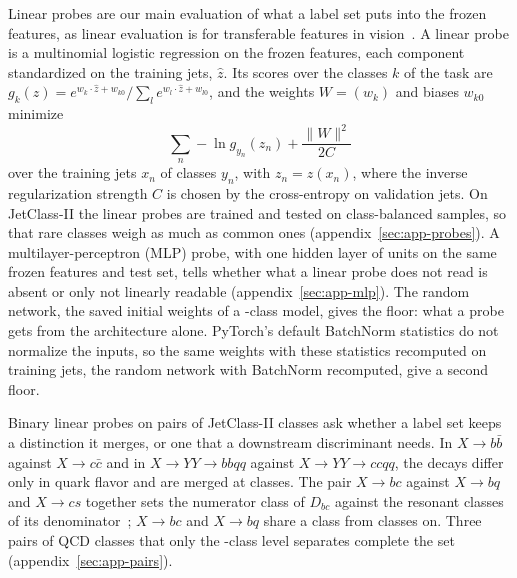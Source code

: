 Linear probes are our main evaluation of what a label set puts into the frozen features, as linear evaluation
is for transferable features in vision~\cite{kornblith}. A linear probe is a multinomial logistic regression on
the frozen features, each component standardized on the training jets, $\hat z$. Its scores over the classes $k$
of the task are $g_k(z) = e^{w_k\cdot\hat z + w_{k0}} / \sum_l e^{w_l\cdot\hat z + w_{l0}}$, and the weights
$W = (w_k)$ and biases $w_{k0}$ minimize
\begin{equation}\label{eq:probe}
  \sum_{n} -\ln g_{y_n}(z_n) + \frac{\lVert W\rVert^2}{2C}
\end{equation}
over the training jets $x_n$ of classes $y_n$, with $z_n = z(x_n)$, where the inverse regularization strength $C$
is chosen by the cross-entropy on validation jets. On JetClass-II the linear probes are trained and tested on
class-balanced samples, so that rare classes weigh as much as common ones (appendix~\ref{sec:app-probes}). A
multilayer-perceptron (MLP) probe, with one hidden layer of \LpMlpHidden{} units on the same frozen features and test
set, tells whether what a linear probe does not read is absent or only not linearly readable
(appendix~\ref{sec:app-mlp}). The random network, the saved initial weights of a \Kfull-class model, gives the
floor: what a probe gets from the architecture alone. PyTorch's default BatchNorm statistics do not normalize the
inputs, so the same weights with these statistics recomputed on \DesignBnJets{} training jets, the random network
with BatchNorm recomputed, give a second floor.

Binary linear probes on pairs of JetClass-II classes ask whether a label set keeps a distinction it merges, or
one that a downstream discriminant needs. In $X\to b\bar b$ against $X\to c\bar c$ and in $X\to YY\to bbqq$
against $X\to YY\to ccqq$, the decays differ only in quark flavor and are merged at \Kcoarse{} classes. The
pair $X\to bc$ against $X\to bq$ and $X\to cs$ together sets the numerator class of $D_{bc}$ against the
resonant classes of its denominator~\cite[Eq.~(1)]{vcbboosted}; $X\to bc$ and $X\to bq$ share a class from
\Kmid{} classes on. Three pairs of QCD classes that only the \Kfull-class level separates complete the set
(appendix~\ref{sec:app-pairs}).

